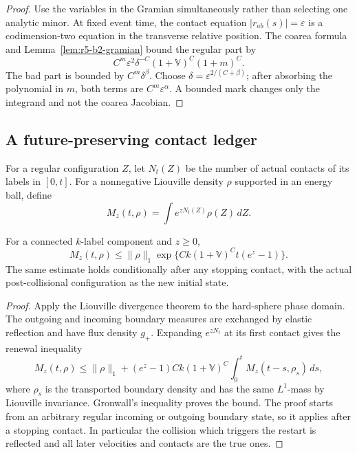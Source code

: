 \begin{proof}
Use the variables in the Gramian simultaneously rather than selecting one
analytic minor.  At fixed event time, the contact equation
\(|r_{ab}(s)|=\varepsilon\) is a codimension-two equation in the transverse
relative position.  The coarea formula and
Lemma~\ref{lem:r5-b2-gramian} bound the regular part by
\[
 C^m\varepsilon^2\delta^{-C}(1+\mathbb V)^C(1+m)^C.
\]
The bad part is bounded by \(C^m\delta^\beta\).  Choose
\(\delta=\varepsilon^{2/(C+\beta)}\); after absorbing the polynomial in
\(m\), both terms are \(C^m\varepsilon^\alpha\).  A bounded mark changes only
the integrand and not the coarea Jacobian.
\end{proof}

\subsection{A future-preserving contact ledger}

For a regular configuration \(Z\), let \(N_t(Z)\) be the number of actual
contacts of its labels in \([0,t]\).  For a nonnegative Liouville density
\(\rho\) supported in an energy ball, define
\[
 M_z(t,\rho)=\int e^{zN_t(Z)}\rho(Z)\,dZ.
\]

\begin{lemma}
\label{lem:r5-b2-ledger}
For a connected \(k\)-label component and \(z\ge0\),
\[
 M_z(t,\rho)
 \le \|\rho\|_1
 \exp\{Ck(1+\mathbb V)^C t(e^z-1)\}.
\]
The same estimate holds conditionally after any stopping contact, with the
actual post-collisional configuration as the new initial state.
\end{lemma}

\begin{proof}
Apply the Liouville divergence theorem to the hard-sphere phase domain.  The
outgoing and incoming boundary measures are exchanged by elastic reflection
and have flux density \(g_+\).  Expanding \(e^{zN_t}\) at its first contact
gives the renewal inequality
\[
 M_z(t,\rho)\le\|\rho\|_1+
 (e^z-1)Ck(1+\mathbb V)^C
 \int_0^tM_z(t-s,\rho_s)\,ds,
\]
where \(\rho_s\) is the transported boundary density and has the same
\(L^1\)-mass by Liouville invariance.  Gronwall's inequality proves the bound.
The proof starts from an arbitrary regular incoming or outgoing boundary
state, so it applies after a stopping contact.  In particular the collision
which triggers the restart is reflected and all later velocities and contacts
are the true ones.
\end{proof}

